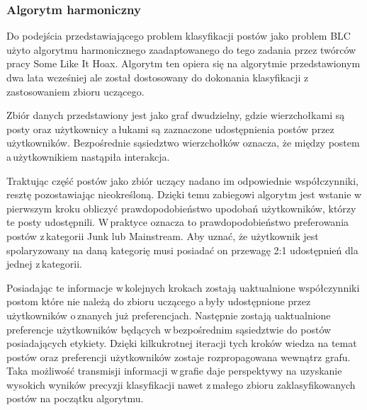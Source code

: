 \subsubsection{Algorytm harmoniczny}
Do podejścia przedstawiającego problem klasyfikacji postów jako problem BLC użyto algorytmu harmonicznego zaadaptowanego do tego zadania przez twórców pracy Some Like It Hoax. Algorytm ten opiera się na algorytmie przedstawionym dwa lata wcześniej\cite{de2015reliable} ale został dostosowany do dokonania klasyfikacji z\,zastosowaniem zbioru uczącego. 
\par
	Zbiór danych przedstawiony jest jako graf dwudzielny, gdzie wierzchołkami są posty oraz użytkownicy a\,łukami są zaznaczone udostępnienia postów przez użytkowników.  Bezpośrednie sąsiedztwo wierzchołków oznacza, że między postem a\,użytkownikiem nastąpiła interakcja.
\par
Traktując część postów jako zbiór uczący nadano im odpowiednie współczynniki, resztę pozostawiając nieokreśloną. Dzięki temu zabiegowi algorytm jest wstanie w\,pierwszym kroku obliczyć prawdopodobieństwo upodobań użytkowników, którzy te posty udostępnili. W\,praktyce oznacza to prawdopodobieństwo preferowania postów z\,kategorii Junk lub Mainstream. Aby uznać, że użytkownik jest spolaryzowany na daną kategorię musi posiadać on przewagę 2:1 udostępnień dla jednej z\,kategorii. 
\par
	Posiadając te informacje w\,kolejnych krokach zostają uaktualnione współczynniki postom które nie należą do zbioru uczącego a\,były udostępnione przez użytkowników o\,znanych już preferencjach. Następnie zostają uaktualnione preferencje użytkowników będących w\,bezpośrednim sąsiedztwie do postów posiadających etykiety. Dzięki kilkukrotnej iteracji tych kroków wiedza na temat postów oraz preferencji użytkowników zostaje rozpropagowana wewnątrz grafu. Taka możliwość transmisji informacji w\,grafie daje perspektywy na uzyskanie wysokich wyników precyzji klasyfikacji nawet z\,małego zbioru zaklasyfikowanych postów na początku algorytmu.
